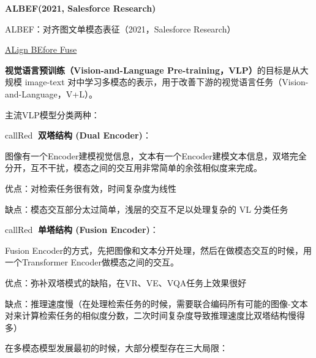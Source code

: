 \documentclass[zihao=false,fontset=windows]{ctexart}
\begin{document}
{\bfseries ALBEF(2021, Salesforce Research)\par}
\vspace{0.15em}

\begin{feishuquote}
ALBEF：对齐图文单模态表征（2021，Salesforce Research）\par
\href{https://arxiv.org/abs/2107.07651}{ALign BEfore Fuse}\par
\end{feishuquote}
\vspace{0.45em}
\textbf{视觉语言预训练（Vision-and-Language Pre-training，VLP）}的目标是从大规模 image-text 对中学习多模态的表示，用于改善下游的视觉语言任务（Vision-and-Language，V+L）。\par
\vspace{0.45em}
主流VLP模型分类两种：\par
\begin{tcbraster}[raster columns=2, raster equal height=rows, raster column skip=9pt, raster row skip=8pt, raster left skip=0pt, raster right skip=0pt]
\begin{feishuboxnb}{callRed}{🌟}
\textbf{双塔结构 (Dual Encoder)}：\par
图像有一个Encoder建模视觉信息，文本有一个Encoder建模文本信息，双塔完全分开，互不干扰，模态之间的交互用非常简单的余弦相似度来完成。\par
\textcolor{feishuBlue}{优点：对检索任务很有效，时间复杂度为线性}\par
\textcolor{feishuBlue}{缺点：模态交互部分太过简单，浅层的交互不足以处理复杂的 VL 分类任务}\par
\end{feishuboxnb}
\begin{feishuboxnb}{callRed}{🌟}
\textbf{单塔结构 (Fusion Encoder)}：\par
Fusion Encoder的方式，先把图像和文本分开处理，然后在做模态交互的时候，用一个Transformer Encoder做模态之间的交互。\par
\textcolor{feishuBlue}{优点：弥补双塔模式的缺陷，在VR、VE、VQA任务上效果很好}\par
\textcolor{feishuBlue}{缺点：推理速度慢（在处理检索任务的时候，需要联合编码所有可能的图像-文本对来计算检索任务的相似度分数，二次时间复杂度导致推理速度比双塔结构慢得多）}\par
\end{feishuboxnb}
\end{tcbraster}
\vspace{0.45em}
在多模态模型发展最初的时候，大部分模型存在三大局限：\par
\end{document}
